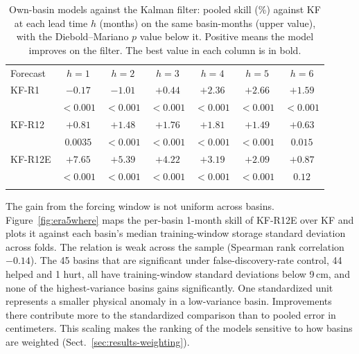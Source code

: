 \documentclass[hess, manuscript]{copernicus}
\begin{document}
\begin{table}[!htbp]
\caption{Own-basin models against the Kalman filter: pooled skill (\%)
against KF at each lead time $h$ (months) on the same basin-months (upper
value), with the Diebold--Mariano $p$ value below it. Positive means the
model improves on the filter. The best value in each column is in bold.}
\label{tab:corrections}
\begin{tabular}{lcccccc}
\tophline
Forecast & $h{=}1$ & $h{=}2$ & $h{=}3$ & $h{=}4$ & $h{=}5$ & $h{=}6$ \\
\middlehline
KF-R1 & $-0.17$ & $-1.01$ & $+0.44$ & $+2.36$ & $\mathbf{+2.66}$ & $\mathbf{+1.59}$ \\
 & $<0.001$ & $<0.001$ & $<0.001$ & $<0.001$ & $<0.001$ & $<0.001$ \\
KF-R12 & $+0.81$ & $+1.48$ & $+1.76$ & $+1.81$ & $+1.49$ & $+0.63$ \\
 & $0.0035$ & $<0.001$ & $<0.001$ & $<0.001$ & $<0.001$ & $0.015$ \\
KF-R12E & $\mathbf{+7.65}$ & $\mathbf{+5.39}$ & $\mathbf{+4.22}$ & $\mathbf{+3.19}$ & $+2.09$ & $+0.87$ \\
 & $<0.001$ & $<0.001$ & $<0.001$ & $<0.001$ & $<0.001$ & $0.12$ \\
\bottomhline
\end{tabular}
\end{table}

The gain from the forcing window is not uniform across basins.
Figure~\ref{fig:era5where} maps the per-basin 1-month skill of KF-R12E
over KF and plots it against each basin's median training-window storage
standard deviation across folds. The relation is weak across the sample
(Spearman rank correlation $-0.14$). The 45 basins that are significant under
false-discovery-rate control, 44 helped and 1 hurt, all have
training-window standard deviations below 9\,cm, and none of the
highest-variance basins gains significantly. One standardized unit
represents a smaller physical anomaly in a low-variance basin. Improvements
there contribute more to the standardized comparison than to pooled error
in centimeters. This scaling makes the ranking of the
models sensitive to how basins are weighted
(Sect.~\ref{sec:results-weighting}).
\end{document}
